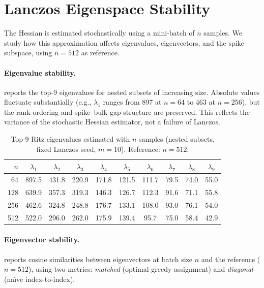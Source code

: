 \documentclass[11pt,a4paper]{article}
\begin{document}
\newpage

\appendix

\section{Lanczos Eigenspace Stability}
\label{app:convergence}

The Hessian is estimated stochastically using a mini-batch of $n$
samples. We study how this approximation affects eigenvalues,
eigenvectors, and the spike subspace, using $n = 512$ as reference.

\paragraph{Eigenvalue stability.}
 reports the top-9 eigenvalues for
nested subsets of increasing size. Absolute values fluctuate
substantially (e.g., $\lambda_1$ ranges from 897 at $n{=}64$ to 463
at $n{=}256$), but the rank ordering and spike--bulk gap structure are
preserved. This reflects the variance of the stochastic Hessian
estimator, not a failure of Lanczos.

\begin{table}[ht]
\centering
\caption{Top-9 Ritz eigenvalues estimated with $n$ samples (nested
subsets, fixed Lanczos seed, $m=10$). Reference: $n=512$.}
\label{tab:eigenvalue_stability}
\begin{tabular}{rccccccccc}
\toprule
$n$ & $\lambda_1$ & $\lambda_2$ & $\lambda_3$ & $\lambda_4$ &
  $\lambda_5$ & $\lambda_6$ & $\lambda_7$ & $\lambda_8$ &
  $\lambda_9$ \\
\midrule
 64 & 897.5 & 431.8 & 220.9 & 171.8 & 121.5 & 111.7 & 79.5 & 74.0 & 55.0 \\
128 & 639.9 & 357.3 & 319.3 & 146.3 & 126.7 & 112.3 & 91.6 & 71.1 & 55.8 \\
256 & 462.6 & 324.8 & 248.8 & 176.7 & 133.1 & 108.0 & 93.0 & 76.1 & 54.0 \\
512 & 522.0 & 296.0 & 262.0 & 175.9 & 139.4 &  95.7 & 75.0 & 58.4 & 42.9 \\
\bottomrule
\end{tabular}
\end{table}

\paragraph{Eigenvector stability.}
 reports cosine similarities between
eigenvectors at batch size $n$ and the reference ($n{=}512$), using
two metrics: \emph{matched} (optimal greedy assignment) and
\emph{diagonal} (na\"ive index-to-index).
\end{document}
